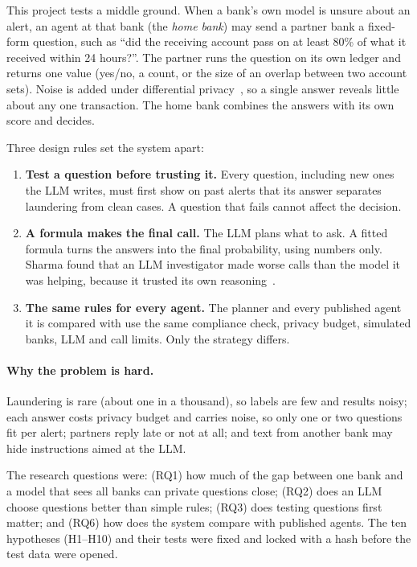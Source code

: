 \documentclass[11pt,a4paper]{article}
\begin{document}
This project tests a middle ground. When a bank's own model is unsure about an alert, an agent at that bank (the \emph{home bank}) may send a partner bank a fixed-form question, such as ``did the receiving account pass on at least 80\% of what it received within 24 hours?''. The partner runs the question on its own ledger and returns one value (yes/no, a count, or the size of an overlap between two account sets). Noise is added under differential privacy~\cite{dwork2014}, so a single answer reveals little about any one transaction. The home bank combines the answers with its own score and decides.

Three design rules set the system apart:
\begin{enumerate}
\item \textbf{Test a question before trusting it.} Every question, including new ones the LLM writes, must first show on past alerts that its answer separates laundering from clean cases. A question that fails cannot affect the decision.
\item \textbf{A formula makes the final call.} The LLM plans what to ask. A fitted formula turns the answers into the final probability, using numbers only. Sharma found that an LLM investigator made worse calls than the model it was helping, because it trusted its own reasoning~\cite{sharma2026}.
\item \textbf{The same rules for every agent.} The planner and every published agent it is compared with use the same compliance check, privacy budget, simulated banks, LLM and call limits. Only the strategy differs.
\end{enumerate}

\paragraph{Why the problem is hard.} Laundering is rare (about one in a thousand), so labels are few and results noisy; each answer costs privacy budget and carries noise, so only one or two questions fit per alert; partners reply late or not at all; and text from another bank may hide instructions aimed at the LLM.

\noindent The research questions were: (RQ1) how much of the gap between one bank and a model that sees all banks can private questions close; (RQ2) does an LLM choose questions better than simple rules; (RQ3) does testing questions first matter; and (RQ6) how does the system compare with published agents. The ten hypotheses (H1--H10) and their tests were fixed and locked with a hash before the test data were opened.
\end{document}
